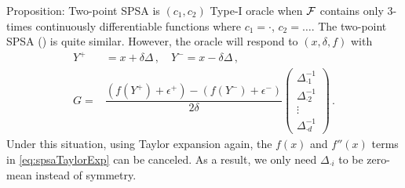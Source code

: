Proposition: Two-point SPSA is $(c_1,c_2)$ Type-I oracle when $\mathcal{F}$ contains only $3$-times continuously differentiable functions where  $c_1 = \cdot$, $c_2 = \dots$. 
The two-point SPSA (\cite{spall1992multivariate}) is quite similar. However, the oracle will respond to $(x,\delta,f)$ with
\begin{align*}
Y^+ &= x+\delta \Delta \,,\quad
Y^- = x-\delta \Delta \,, \\
G =& \dfrac{\left(f(Y^+)+\epsilon^+\right) - \left(f(Y^-)+\epsilon^-\right)}{2\delta}\begin{pmatrix}\Delta_{\cdot1}^{-1}\\\Delta_{\cdot2}^{-1}\\ \vdots\\ \Delta_{\cdot
 d}^{-1}\end{pmatrix} \,.
\end{align*}
Under this situation, using Taylor expansion again, the $f(x)$ and $f''(x)$ terms in \eqref{eq:spsaTaylorExp} can be canceled. As a result, we only need $\Delta_{\cdot i}$ to be zero-mean instead of symmetry.


